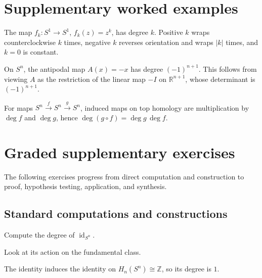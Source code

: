 \section{Supplementary worked examples}
\label{sec:viii03-pedagogy}

\begin{example}\label{ex:viii03-ped-01}
The map $f_k:S^1\to S^1$, $f_k(z)=z^k$, has degree $k$.  Positive $k$ wraps counterclockwise $k$ times, negative $k$ reverses orientation and wraps $|k|$ times, and $k=0$ is constant.
\end{example}

\begin{example}\label{ex:viii03-ped-02}
On $S^n$, the antipodal map $A(x)=-x$ has degree $(-1)^{n+1}$.  This follows from viewing $A$ as the restriction of the linear map $-I$ on $\mathbb R^{n+1}$, whose determinant is $(-1)^{n+1}$.
\end{example}

\begin{example}\label{ex:viii03-ped-03}
For maps $S^n\xrightarrow{f}S^n\xrightarrow{g}S^n$, induced maps on top homology are multiplication by $\deg f$ and $\deg g$, hence $\deg(g\circ f)=\deg g\,\deg f$.
\end{example}

\section{Graded supplementary exercises}
The following exercises progress from direct computation and construction to proof, hypothesis testing, application, and synthesis.

\subsection*{Standard computations and constructions}

\begin{exercise}\label{exr:viii03-ped-01}
Compute the degree of $\operatorname{id}_{S^n}$.
\end{exercise}
\begin{hint}
Look at its action on the fundamental class.
\end{hint}
\begin{solution}
The identity induces the identity on $H_n(S^n)\cong\mathbb Z$, so its degree is $1$.
\end{solution}

